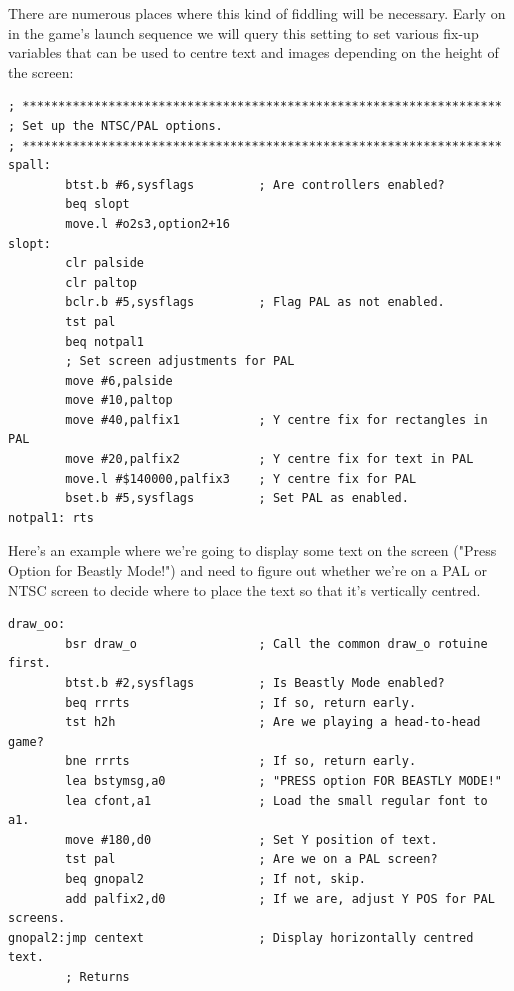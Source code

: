 There are numerous places where this kind of fiddling will be necessary. Early on in the
game's launch sequence we will query this  setting to set various fix-up
variables that can be used to centre text and images depending on the height of the
screen:

\begin{lstlisting}
; *******************************************************************
; Set up the NTSC/PAL options.
; *******************************************************************
spall:
        btst.b #6,sysflags         ; Are controllers enabled?
        beq slopt
        move.l #o2s3,option2+16
slopt:
        clr palside
        clr paltop
        bclr.b #5,sysflags         ; Flag PAL as not enabled.
        tst pal
        beq notpal1
        ; Set screen adjustments for PAL
        move #6,palside
        move #10,paltop
        move #40,palfix1           ; Y centre fix for rectangles in PAL
        move #20,palfix2           ; Y centre fix for text in PAL
        move.l #$140000,palfix3    ; Y centre fix for PAL
        bset.b #5,sysflags         ; Set PAL as enabled.
notpal1: rts
\end{lstlisting}

Here's an example where we're going to display some text on the screen
("Press Option for Beastly Mode!") and need to figure out whether we're on
a PAL or NTSC screen to decide where to place the text so that it's vertically
centred.
\clearpage
\begin{lstlisting}
draw_oo:
        bsr draw_o                 ; Call the common draw_o rotuine first.
        btst.b #2,sysflags         ; Is Beastly Mode enabled?
        beq rrrts                  ; If so, return early.
        tst h2h                    ; Are we playing a head-to-head game?
        bne rrrts                  ; If so, return early.
        lea bstymsg,a0             ; "PRESS option FOR BEASTLY MODE!"
        lea cfont,a1               ; Load the small regular font to a1.
        move #180,d0               ; Set Y position of text.
        tst pal                    ; Are we on a PAL screen?
        beq gnopal2                ; If not, skip.
        add palfix2,d0             ; If we are, adjust Y POS for PAL screens.
gnopal2:jmp centext                ; Display horizontally centred text.
        ; Returns
\end{lstlisting}

